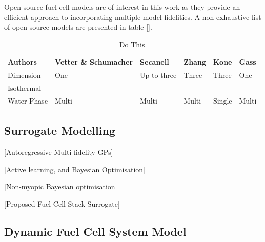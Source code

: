 Open-source fuel cell models are of interest in this work as they provide an efficient approach to incorporating multiple model fidelities. A non-exhaustive list of open-source models are presented in table [].

\begin{center}
	\begin{table}
		\caption{Do This}
		\begin{tabularx}{\linewidth}{V Y Z Z Z Z}
			\toprule
			Authors     & Vetter \& Schumacher & Secanell \etal & Zhang \etal & Kone \etal & Gass \etal \\
			\midrule
			Dimension   & One                  & Up to three    & Three       & Three      & One        \\
			Isothermal  &                                                                               \\
			Water Phase & Multi                & Multi          & Multi       & Single     & Multi      \\
			\bottomrule
		\end{tabularx}
		\label{tab:opensource}
	\end{table}
\end{center}

\subsection{Surrogate Modelling}

[Autoregressive Multi-fidelity GPs]

[Active learning, and Bayesian Optimisation]

[Non-myopic Bayesian optimisation]

[Proposed Fuel Cell Stack Surrogate]

\subsection{Dynamic Fuel Cell System Model}

